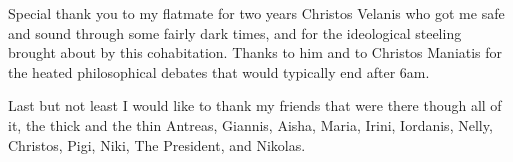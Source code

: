 \begin{precontent}
Special thank you to my flatmate for two years Christos Velanis who
got me safe and sound through some fairly dark times, and for the
ideological steeling brought about by this cohabitation. Thanks to him
and to Christos Maniatis for the heated philosophical debates that
would typically end after 6am.

Last but not least I would like to thank my friends that were there
though all of it, the thick and the thin Antreas, Giannis, Aisha,
Maria, Irini, Iordanis, Nelly, Christos, Pigi, Niki, The President,
and Nikolas.






\end{precontent}


\tableofcontents

\cleardoublepage
{}
{}
\listoffigures
\listoflistings

\cleardoublepage%
